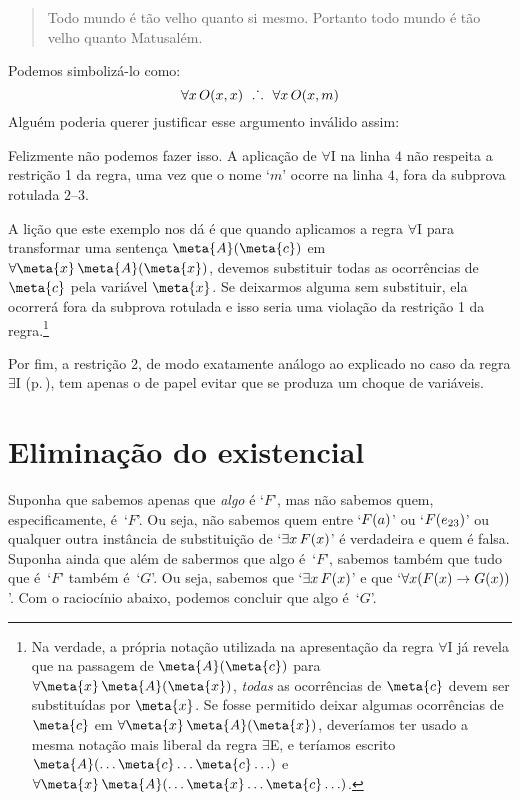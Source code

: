 	\begin{quote}
	Todo mundo é tão velho quanto si mesmo. Portanto todo mundo é tão velho quanto Matusalém.
	\end{quote}
Podemos simbolizá-lo como:
$$\forall x\,\mathord{O}(x,x) \ \mathrel{\ldotp\dot{}\,\ldotp} \ \forall x\,\mathord{O}(x,m)$$
Alguém poderia querer justificar esse argumento inválido assim:
\begin{fitchproof}
	\open
	\close {}	
\end{fitchproof}
Felizmente não podemos fazer isso. A aplicação de $\forall$I na linha $4$ não respeita a restrição 1 da regra, uma vez que o nome `$m$' ocorre na linha $4$, fora da subprova rotulada $2$--$3$.  

A lição que este exemplo nos dá é que quando aplicamos a regra $\forall$I para transformar uma sentença $\meta{A}(\meta{c})$ em $\forall \meta{x}\,\meta{A}(\meta{x})$, devemos substituir todas as ocorrências de $\meta{c}$ pela variável $\meta{x}$.
Se deixarmos alguma sem substituir, ela ocorrerá fora da subprova rotulada e isso seria uma violação da restrição 1 da regra.\footnote{
	Na verdade, a própria notação utilizada na apresentação da regra $\forall$I já revela que na passagem de $\meta{A}(\meta{c})$ para $\forall \meta{x}\,\meta{A}(\meta{x})$, \textit{todas} as ocorrências de $\meta{c}$ devem ser substituídas por $\meta{x}$.
	Se fosse permitido deixar algumas ocorrências de $\meta{c}$ em $\forall \meta{x}\,\meta{A}(\meta{x})$, deveríamos ter usado a mesma notação mais liberal da regra $\exists$E, e teríamos escrito $\meta{A}(\ldots \meta{c}\ldots\meta{c}\ldots)$ e  $\forall \meta{x}\,\meta{A}(\ldots\meta{x}\ldots\meta{c}\ldots)$.}

Por fim, a restrição 2, de modo exatamente análogo ao explicado no caso da regra $\exists$I (p.\,\pageref{RegraEI}), tem apenas o de papel evitar que se produza um choque de variáveis.

\section{Eliminação do existencial}
Suponha que sabemos apenas que \emph{algo}  é `$F$’, mas não sabemos quem, especificamente,  é~`$F$'.  Ou seja, não sabemos quem entre `$\mathord{F}(a)$’ ou `$\mathord{F}(e_{23})$’ ou qualquer outra instância de substituição de `$\exists x\,\mathord{F}(x)$’ é verdadeira e quem é falsa.  Suponha ainda que além de sabermos que algo  é~`$F$’, sabemos também que tudo que
é~`$F$' também é~`$G$'.  Ou seja, sabemos que `$\exists x\,\mathord{F}(x)$’ e que `$\forall x(\mathord{F}(x) \rightarrow \mathord{G}(x))$’. Com o raciocínio abaixo, podemos concluir que algo é~`$G$’.
 
